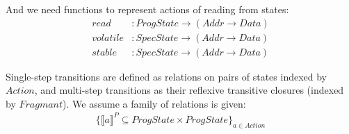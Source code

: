 \documentclass[a4paper,11pt]{article}
\theoremstyle{definition}
\begin{document}
And we need functions to represent actions of reading from states:
\begin{align*}
	read &: \mathit{ProgState} \to (\mathit{Addr} \to \mathit{Data})\\
	volatile &: \mathit{SpecState} \to (\mathit{Addr} \to \mathit{Data})\\
	stable &: \mathit{SpecState} \to (\mathit{Addr} \to \mathit{Data})
\end{align*}

\newpage

Single-step transitions are defined as relations on pairs of states indexed by $\mathit{Action}$, and multi-step transitions as their reflexive transitive closures (indexed by $\mathit{Fragmant}$). We assume a family of relations is given:
\begin{align*}
	\{ \llbracket a \rrbracket^P \subseteq \mathit{ProgState \times ProgState} \}_\mathit{a \in Action}
\end{align*}
\end{document}
